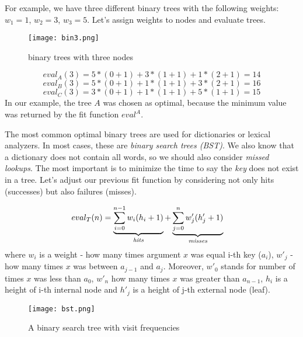 \documentclass[12pt]{article}
\newcommand{\sumin}[2]{\sum\limits_{#1}^{#2}}
\begin{document}
For example, we have three different binary trees with the following weights:
$w_1 = 1$, $w_2 = 3$, $w_3 = 5$.
Let's assign weights to nodes and evaluate trees.

\begin{figure}[ht]
\centering
\texttt{[image: bin3.png]}
\caption{binary trees with three nodes}
\label{fig:bin3}
\end{figure}

\begin{equation}
    eval_{A}(3) = 5 * (0 + 1) + 3 * (1 + 1) + 1 * (2 + 1) = 14
\end{equation}
\begin{equation}
    eval_{B}(3) = 5 * (0 + 1) + 1 * (1 + 1) + 3 * (2 + 1) = 16
\end{equation}
\begin{equation}
    eval_{C}(3) = 3 * (0 + 1) + 1 * (1 + 1) + 5 * (1 + 1) = 15
\end{equation}
In our example, the tree $A$ was chosen as optimal, because the minimum value was returned by the fit function $eval^A$.


The most common optimal binary trees are used for dictionaries or lexical analyzers. In most cases, these are \textit{binary search trees (BST)}.
We also know that a dictionary does not contain all words, so we should also consider \textit{missed lookups}. The most important is to minimize the time to say the \textit{key} does not exist in a tree.
Let's adjust our previous fit function by considering not only hits (successes) but also failures (misses).

\[
eval_{T}( n ) = \underbrace{\sumin{i=0}{n-1}w_i (h_i + 1)}_{\emph{hits}} + \underbrace{\sumin{j=0}{n}w'_j (h'_j + 1)}_{\emph{misses}}\quad
\]
where $w_i$ is a weight - how many times argument $x$ was equal i-th key ($a_i$),
$w'_j$ - how many times $x$ was between $a_{j-1}$ and $a_{j}$. Moreover, $w'_0$ stands for number of times $x$ was less than $a_0$, $w'_n$ how many times $x$ was greater than $a_{n-1}$,
$h_i$ is a height of i-th internal node and $h'_j$ is a height of j-th external node (leaf).

\begin{figure}[ht]
\centering
\texttt{[image: bst.png]}
\caption{A binary search tree with visit frequencies}
\label{fig:bst}
\end{figure}


\end{document}

